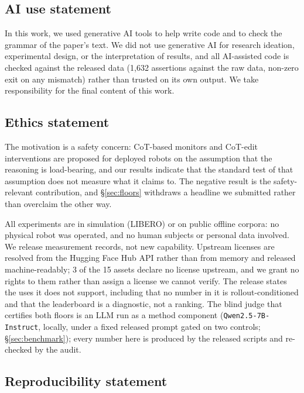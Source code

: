 \documentclass{article}
\begin{document}
\subsection*{AI use statement}

In this work, we used generative AI tools to help write code and to check the grammar of the paper's text. We did not use generative AI for research ideation, experimental design, or the interpretation of results, and all AI-assisted code is checked against the released data (1,632 assertions against the raw data, non-zero exit on any mismatch) rather than trusted on its own output. We take responsibility for the final content of this work.

\subsection*{Ethics statement}

The motivation is a safety concern: CoT-based monitors and CoT-edit interventions are proposed for deployed robots on the assumption that the reasoning is load-bearing, and our results indicate that the standard test of that assumption does not measure what it claims to. The negative result is the safety-relevant contribution, and \S\ref{sec:floors} withdraws a headline we submitted rather than overclaim the other way.

All experiments are in simulation (LIBERO) or on public offline corpora: no physical robot was operated, and no human subjects or personal data involved. We release measurement records, not new capability. Upstream licenses are resolved from the Hugging Face Hub API rather than from memory and released machine-readably; 3 of the 15 assets declare no license upstream, and we grant no rights to them rather than assign a license we cannot verify. The release states the uses it does not support, including that no number in it is rollout-conditioned and that the leaderboard is a diagnostic, not a ranking. The blind judge that certifies both floors is an LLM run as a method component (\texttt{Qwen2.5-7B-Instruct}, locally, under a fixed released prompt gated on two controls; \S\ref{sec:benchmark}); every number here is produced by the released scripts and re-checked by the audit.

\subsection*{Reproducibility statement}
\end{document}
